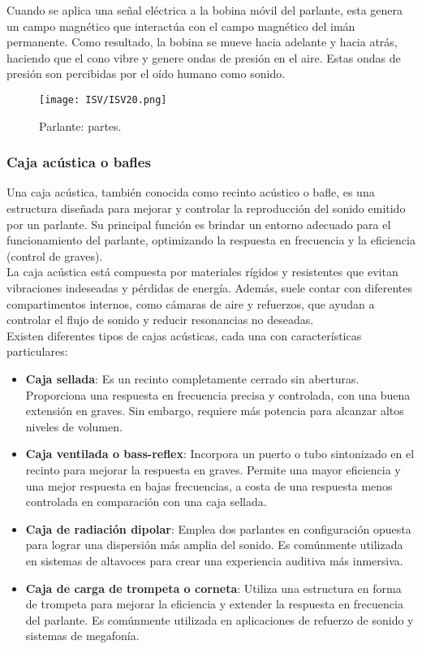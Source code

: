 \documentclass[
	12pt, %
	fleqn, %
	a4paper, %
	oneside, %
]{LegrandOrangeBook}
\begin{document}
Cuando se aplica una señal eléctrica a la bobina móvil del parlante, esta genera un campo magnético que interactúa con el campo magnético del imán permanente. Como resultado, la bobina se mueve hacia adelante y hacia atrás, haciendo que el cono vibre y genere ondas de presión en el aire. Estas ondas de presión son percibidas por el oído humano como sonido.

\begin{figure}[H]
\centering
\texttt{[image: ISV/ISV20.png]}
\caption{Parlante: partes.}
\end{figure}

\subsubsection{Caja acústica o bafles}
Una caja acústica, también conocida como recinto acústico o bafle, es una estructura diseñada para mejorar y controlar la reproducción del sonido emitido por un parlante. Su principal función es brindar un entorno adecuado para el funcionamiento del parlante, optimizando la respuesta en frecuencia y la eficiencia (control de graves).\\
La caja acústica está compuesta por materiales rígidos y resistentes que evitan vibraciones indeseadas y pérdidas de energía. Además, suele contar con diferentes compartimentos internos, como cámaras de aire y refuerzos, que ayudan a controlar el flujo de sonido y reducir resonancias no deseadas.\\
Existen diferentes tipos de cajas acústicas, cada una con características particulares:

\begin{itemize}
  \item \textbf{Caja sellada}: Es un recinto completamente cerrado sin aberturas. Proporciona una respuesta en frecuencia precisa y controlada, con una buena extensión en graves. Sin embargo, requiere más potencia para alcanzar altos niveles de volumen.

  \item \textbf{Caja ventilada o bass-reflex}: Incorpora un puerto o tubo sintonizado en el recinto para mejorar la respuesta en graves. Permite una mayor eficiencia y una mejor respuesta en bajas frecuencias, a costa de una respuesta menos controlada en comparación con una caja sellada.

  \item \textbf{Caja de radiación dipolar}: Emplea dos parlantes en configuración opuesta para lograr una dispersión más amplia del sonido. Es comúnmente utilizada en sistemas de altavoces para crear una experiencia auditiva más inmersiva.

  \item \textbf{Caja de carga de trompeta o corneta}: Utiliza una estructura en forma de trompeta para mejorar la eficiencia y extender la respuesta en frecuencia del parlante. Es comúnmente utilizada en aplicaciones de refuerzo de sonido y sistemas de megafonía.

\end{itemize}
\end{document}
